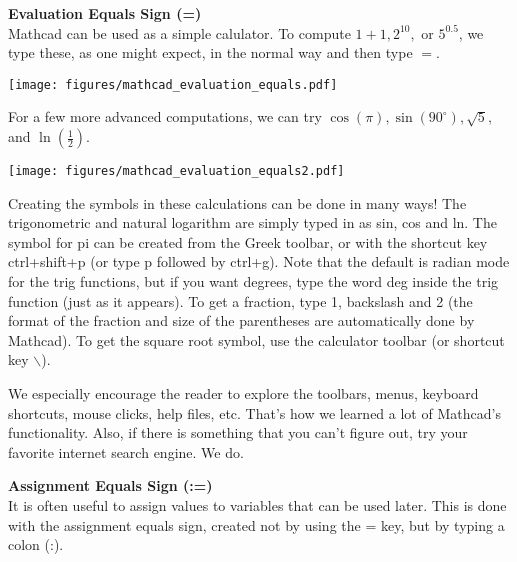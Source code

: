 \noindent \large \textsf{\textbf{Evaluation Equals Sign (=)}} \normalsize\\

Mathcad can be used as a simple calulator.  To compute $1+1, 2^{10},$ or $5^{0.5}$, we type these, as one might expect, in the normal way and then type $=$.

\begin{center}
\texttt{[image: figures/mathcad\_evaluation\_equals.pdf]} %
\end{center}

For a few more advanced computations, we can try $\cos(\pi), \sin(90^\circ), \sqrt{5},$ and  $\ln\left(\displaystyle \frac{1}{2}\right).$
\begin{center}
\texttt{[image: figures/mathcad\_evaluation\_equals2.pdf]} %
\end{center}

Creating the symbols in these calculations can be done in many ways!  The trigonometric and natural logarithm are simply typed in as sin, cos and ln.
The symbol for pi can be created from the Greek toolbar, or with the shortcut key ctrl+shift+p (or type p followed by ctrl+g).  Note that the default is radian mode for the trig functions, but if you want degrees, type the word deg inside the trig function (just as it appears).  To get a fraction, type 1, backslash and 2 (the format of the fraction and size of the parentheses are automatically done by Mathcad).  To get the square root symbol, use the calculator toolbar (or shortcut key $\backslash$).

We especially encourage the reader to explore the toolbars, menus, keyboard shortcuts, mouse clicks, help files, etc.  That's how we learned a lot of Mathcad's functionality.  Also, if there is something that you can't figure out, try your favorite internet search engine.  We do.\\

\newpage

\noindent \large \textsf{\textbf{Assignment Equals Sign (:=)}} \normalsize\\

It is often useful to assign values to variables that can be used later.  This is done with the assignment equals sign, created not by using the = key, but by typing a colon (:).

